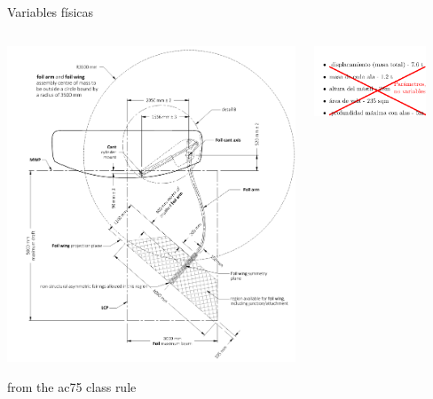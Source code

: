 \documentclass[presentation,aspectratio=169]{beamer}
\begin{document}
\begin{frame}[label={sec:org55fb2de}]{Variables físicas}
\begin{columns}
\begin{column}{0.5\columnwidth}
\begin{center}
\includegraphics[height=0.8\textheight]{../../figures/ac75-class-foil.png}
\end{center}

{\footnotesize from the ac75 class rule}
\end{column}
\begin{column}{0.5\columnwidth}
\begin{center}
\includegraphics[width=0.8\textwidth]{../../figures/parameters-not-variables}
\end{center}
\end{column}
\end{columns}
\end{frame}
\end{document}
